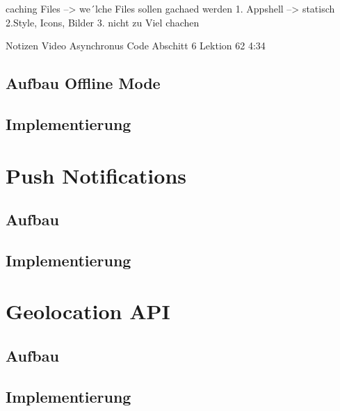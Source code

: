 
caching Files --> we´lche Files sollen gachaed werden
	1. Appshell --> statisch
		2.Style, Icons, Bilder
		3. nicht zu Viel chachen
		
		
Notizen Video
	Asynchronus Code Abschitt 6 Lektion 62 4:34 
	 

\subsection{Aufbau Offline Mode}
\subsection{Implementierung}

\section{Push Notifications}
\subsection{Aufbau}
\subsection{Implementierung}

\section{Geolocation API}
\subsection{Aufbau}
\subsection{Implementierung}










